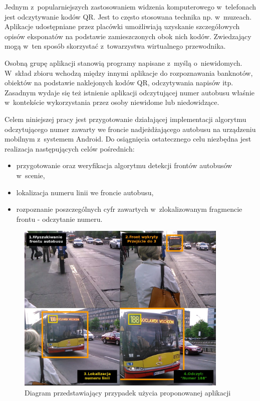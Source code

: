 Jednym z~popularniejszych zastosowaniem widzenia komputerowego w~telefonach
jest odczytywanie kodów QR. Jest to często stosowana technika
np. w~muzeach. Aplikacje udostępniane przez placówki 
umożliwiają uzyskanie szczegółowych opisów eksponatów na
podstawie zamieszczonych obok nich kodów. Zwiedzający mogą w~ten sposób 
skorzystać z~towarzystwa wirtualnego przewodnika. 

Osobną grupę aplikacji stanowią programy napisane z~myślą 
o~niewidomych. W~skład zbioru wchodzą między innymi aplikacje
do rozpoznawania banknotów, obiektów na podstawie
naklejonych kodów QR, odczytywania napisów itp.
Zasadnym wydaje się też istnienie aplikacji odczytującej numer 
autobusu właśnie w~kontekście wykorzystania przez osoby niewidome lub
niedowidzące. 

Celem niniejszej pracy jest przygotowanie działającej implementacji
algorytmu odczytującego numer zawarty we froncie nadjeżdżającego
autobusu na urządzeniu mobilnym z~systemem Android.
Do osiągnięcia ostatecznego celu niezbędna jest
realizacja następujących celów pośrednich:

\begin{itemize}
    \item przygotowanie
oraz weryfikacja algorytmu detekcji frontów autobusów w~scenie,
    \item lokalizacja numeru linii we froncie autobusu,
    \item rozpoznanie poszczególnych cyfr zawartych
        w~zlokalizowanym fragmencie frontu - odczytanie numeru. 
\end{itemize}

\begin{figure}[!h]
    \centering
    \includegraphics[width=0.9\textwidth]{img/int_use_case_sequence}
    \caption{Diagram przedstawiający przypadek użycia proponowanej aplikacji}
    \label{fig:int_use_case_diag}
\end{figure}

